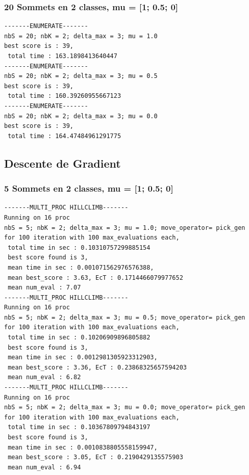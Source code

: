 \documentclass[a4paper]{article}
\begin{document}
\subsubsection{20 Sommets en 2 classes, mu = [1; 0.5; 0]}
\begin{verbatim}
-------ENUMERATE-------
nbS = 20; nbK = 2; delta_max = 3; mu = 1.0
best score is : 39,
 total time : 163.1898413640447
-------ENUMERATE-------
nbS = 20; nbK = 2; delta_max = 3; mu = 0.5
best score is : 39,
 total time : 160.39260955667123
-------ENUMERATE-------
nbS = 20; nbK = 2; delta_max = 3; mu = 0.0
best score is : 39,
 total time : 164.47484961291775
\end{verbatim}

\subsection{Descente de Gradient}
\subsubsection{5 Sommets en 2 classes, mu = [1; 0.5; 0]}
\begin{verbatim}
-------MULTI_PROC HILLCLIMB-------
Running on 16 proc
nbS = 5; nbK = 2; delta_max = 3; mu = 1.0; move_operator= pick_gen
for 100 iteration with 100 max_evaluations each, 
 total time in sec : 0.10310757299885154
 best score found is 3,
 mean time in sec : 0.001071562976576388,
 mean best_score : 3.63, EcT : 0.1714466079977652
 mean num_eval : 7.07
-------MULTI_PROC HILLCLIMB-------
Running on 16 proc
nbS = 5; nbK = 2; delta_max = 3; mu = 0.5; move_operator= pick_gen
for 100 iteration with 100 max_evaluations each, 
 total time in sec : 0.10206909896805882
 best score found is 3,
 mean time in sec : 0.0012981305923312903,
 mean best_score : 3.36, EcT : 0.23868325657594203
 mean num_eval : 6.82
-------MULTI_PROC HILLCLIMB-------
Running on 16 proc
nbS = 5; nbK = 2; delta_max = 3; mu = 0.0; move_operator= pick_gen
for 100 iteration with 100 max_evaluations each, 
 total time in sec : 0.10367809794843197
 best score found is 3,
 mean time in sec : 0.0010838805558159947,
 mean best_score : 3.05, EcT : 0.2190429135575903
 mean num_eval : 6.94
\end{verbatim}
\end{document}
